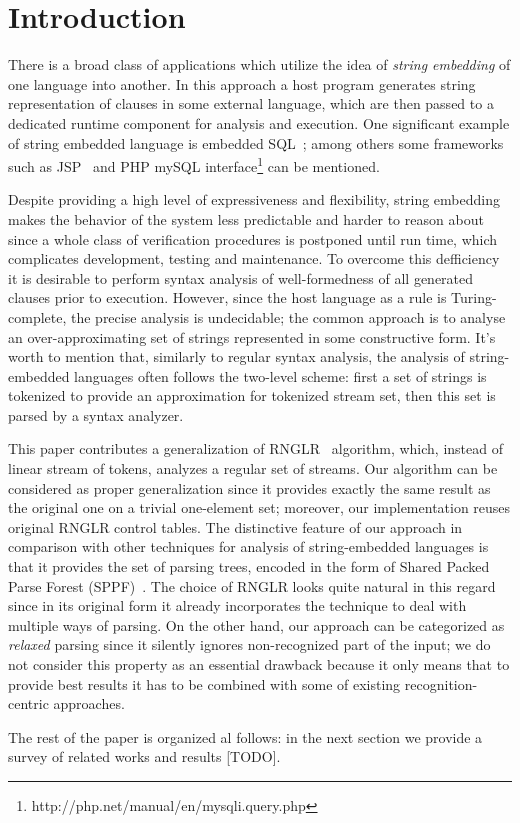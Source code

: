 \section*{Introduction}
There is a broad class of applications which utilize the idea of \emph{string embedding} of one 
language into another. In this approach a host program generates string representation of 
clauses in some external language, which are then passed to a dedicated runtime 
component for analysis and execution. One significant example of string embedded 
language is embedded SQL~\cite{DSQLISO}; among others some frameworks 
such as JSP~\cite{JSP} and PHP mySQL interface\footnote{http://php.net/manual/en/mysqli.query.php} 
can be mentioned.

Despite providing a high level of expressiveness and flexibility, string embedding makes the 
behavior of the system less predictable and harder to reason about since a whole class of 
verification procedures is postponed until run time, which complicates development, 
testing and maintenance. To overcome this defficiency it is desirable to perform syntax 
analysis of well-formedness of all generated clauses prior to execution. However, since the 
host language as a rule is Turing-complete, the precise analysis is undecidable; the common 
approach is to analyse an over-approximating set of strings represented in some constructive form. 
It's worth to mention that, similarly to regular syntax analysis, the analysis of string-embedded 
languages often follows the two-level scheme: first a set of strings is tokenized to provide an 
approximation for tokenized stream set, then this set is parsed by a syntax analyzer.

This paper contributes a generalization of RNGLR~\cite{RNGLR} algorithm, which, instead of
linear stream of tokens, analyzes a regular set of streams. Our algorithm can be considered as
proper generalization since it provides exactly the same result as the original one on a
trivial one-element set; moreover, our implementation reuses original RNGLR control tables. The distinctive 
feature of our approach in comparison with other techniques for analysis of string-embedded 
languages is that it provides the set of parsing trees, encoded in the form of Shared Packed 
Parse Forest (SPPF)~\cite{SPPF}. The choice of RNGLR looks quite natural in this regard
since in its original form it already incorporates the technique to deal with multiple
ways of parsing. On the other hand, our approach can be categorized as \emph{relaxed} 
parsing since it silently ignores non-recognized part of the input; we do not consider this 
property as an essential drawback because it only means that to provide best results
it has to be combined with some of existing recognition-centric approaches.

The rest of the paper is organized al follows: in the next section we provide a
survey of related works and results [TODO].
